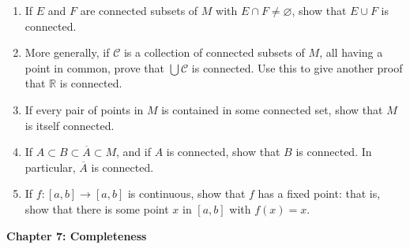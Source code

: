 \documentclass[12pt]{amsart}
\def\RR{{\mathbb R}}
\def\Ccal{{\mathcal C}}
\renewcommand{\emptyset}{\varnothing}
\begin{document}
\begin{enumerate}
\item[\bf 6.5] If $E$ and $F$ are connected subsets of $M$ with $E\cap F\neq\emptyset$, show that $E\cup F$ is connected.

\bigskip

\item[\bf 6.6] More generally, if $\Ccal$ is a collection of connected subsets of $M$, all having a point in common, prove that $\bigcup \Ccal$ is connected. Use this to give another proof that $\RR$ is connected. 

\bigskip

\item[\bf 6.7] If every pair of points in $M$ is contained in some connected set, show that $M$ is itself connected. 

\bigskip

\item[\bf 6.9] If $A\subset B\subset \overline A \subset M$, and if $A$ is connected, show that $B$ is connected. In particular, $\overline A$ is connected.

\bigskip

\item[\bf 6.13] If $f:[a,b]\to[a,b]$ is continuous, show that $f$ has a fixed point: that is, show that there is some point $x$ in $[a,b]$ with $f(x)=x$.

\bigskip

\end{enumerate}

{\bf Chapter 7: Completeness}
\end{document}
